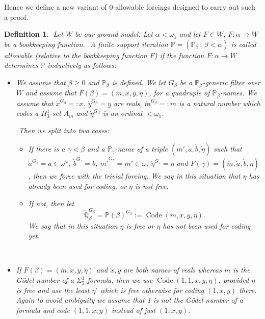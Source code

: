 \documentclass[a4paper,11pt]{article}
\newtheorem{definition}[theorem]{Definition}
\newcommand{\forceP}{\mathbb{P}}
\newcommand{\forceQ}{\mathbb{Q}}
\begin{document}
Hence we define a new variant of 0-allowable forcings designed to carry out such  a proof.


\begin{definition}
    ﻿
    Let $W$ be our ground model. Let $\alpha < \omega_1$ and let $F\in W$, $F: \alpha \rightarrow W$ be a bookkeeping function.
    ﻿
    A finite support iteration $\forceP=(\forceP_{\beta}\,:\, {\beta< \alpha})$ is called allowable (relative to the bookkeeping function $F$)  if the function $F: \alpha \rightarrow W$  determines $\forceP$ inductively as follows:
    ﻿
     \begin{itemize}
    ﻿
     \item[(1)] We assume that $\beta \ge 0$ and $\forceP_{\beta}$ is defined. We let $G_{\beta}$ be a $\forceP_{\beta}$-generic filter over $W$ and assume that $F(\beta)=(\dot{m}, \dot{x}, \dot{y},\dot{\eta})$, for a quadruple of $\forceP_{\beta}$-names. We assume that $\dot{x}^{G_{\beta}}=:x$, $\dot{y}^{G_{\beta}}=y$ are reals, $\dot{m}^{G_{\beta}}=:m $ is a natural number which codes a $\Pi^1_3$-set $A_m$ and $\dot{\eta}^{G_{\beta}}$ is an ordinal $< \omega_1$. 
    ﻿
     
    ﻿
     Then we split into two cases:
    ﻿
     \begin{itemize}
    ﻿
     \item If there is a $\gamma< \beta$ and a $\forceP_{\gamma}$-name of a triple $( \dot{m'}, \dot{a} ,\dot{b},\dot{\eta}) $ such that $\dot{a}^{G_{\gamma}}= a \in \omega^{\omega}$, $\dot{b}^{G_{\gamma}}=b$, $\dot{m'}^{G_{\gamma}}= m' \in \omega$,  $\dot{\eta}^{G_{\gamma}} = \eta$  and
     $F(\gamma)= ( \dot{m}, \dot{a}, \dot{b} ,\dot{\eta}) $, then we force with the trivial forcing. We say in this situation that $\eta$ has already been used for coding, or $\eta$ is not free.
    ﻿
     \item If not, then let \[\dot{\forceQ}_{\beta}^{G_{\beta}}=\forceP(\beta)^{G_{\beta}}:= \operatorname{Code} (m,x,y,\eta) .\] We say that in this situation $\eta$ is free or $\eta$ has not been used for coding yet.
    ﻿
     \end{itemize}
    ﻿
   


\item[(2)] If $F(\beta)= (  \dot{m},\dot{x},\dot{y}, \dot{\eta} )$ and $\dot{x},\dot{y}$ are both names of reals whereas $\dot{m}$ is the G\"odel number of a $\Sigma^1_5$-formula, then we use $\operatorname{Code} (1,1,x,y,\eta)$, provided $\eta$ is free and use the least $\eta'$ which is free otherwise for coding $(1,x,y)$ there. Again to avoid ambiguity we assume that 1 is not the G\"odel number of a formula and code $(1,1,x,y)$ instead of just $(1,x,y)$.

     \end{itemize}
    ﻿
     
    ﻿    \end{definition}
\end{document}
